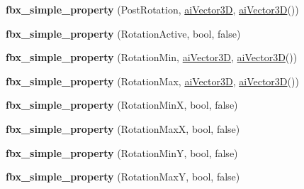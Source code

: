 \begin{DoxyCompactItemize}
\item 
\hypertarget{class_assimp_1_1_f_b_x_1_1_model_ac68b7ffeca0f773d5d138331313d65d6}{{\bfseries fbx\+\_\+simple\+\_\+property} (Post\+Rotation, \hyperlink{structai_vector3_d}{ai\+Vector3\+D}, \hyperlink{structai_vector3_d}{ai\+Vector3\+D}())}\label{class_assimp_1_1_f_b_x_1_1_model_ac68b7ffeca0f773d5d138331313d65d6}

\item 
\hypertarget{class_assimp_1_1_f_b_x_1_1_model_aa38a68cb0289031c447141225fe23e53}{{\bfseries fbx\+\_\+simple\+\_\+property} (Rotation\+Active, bool, false)}\label{class_assimp_1_1_f_b_x_1_1_model_aa38a68cb0289031c447141225fe23e53}

\item 
\hypertarget{class_assimp_1_1_f_b_x_1_1_model_ab06a2ef1d433bc8c077838930423e274}{{\bfseries fbx\+\_\+simple\+\_\+property} (Rotation\+Min, \hyperlink{structai_vector3_d}{ai\+Vector3\+D}, \hyperlink{structai_vector3_d}{ai\+Vector3\+D}())}\label{class_assimp_1_1_f_b_x_1_1_model_ab06a2ef1d433bc8c077838930423e274}

\item 
\hypertarget{class_assimp_1_1_f_b_x_1_1_model_ab4ee46e810103b4b8accaae40c39a97c}{{\bfseries fbx\+\_\+simple\+\_\+property} (Rotation\+Max, \hyperlink{structai_vector3_d}{ai\+Vector3\+D}, \hyperlink{structai_vector3_d}{ai\+Vector3\+D}())}\label{class_assimp_1_1_f_b_x_1_1_model_ab4ee46e810103b4b8accaae40c39a97c}

\item 
\hypertarget{class_assimp_1_1_f_b_x_1_1_model_a6cb91946477cb79200ad57b22aa2d0b3}{{\bfseries fbx\+\_\+simple\+\_\+property} (Rotation\+Min\+X, bool, false)}\label{class_assimp_1_1_f_b_x_1_1_model_a6cb91946477cb79200ad57b22aa2d0b3}

\item 
\hypertarget{class_assimp_1_1_f_b_x_1_1_model_a4d69bb29e7a3179225749bba6ff0bd20}{{\bfseries fbx\+\_\+simple\+\_\+property} (Rotation\+Max\+X, bool, false)}\label{class_assimp_1_1_f_b_x_1_1_model_a4d69bb29e7a3179225749bba6ff0bd20}

\item 
\hypertarget{class_assimp_1_1_f_b_x_1_1_model_abff42bc6212e18965e683f4c9baa86ea}{{\bfseries fbx\+\_\+simple\+\_\+property} (Rotation\+Min\+Y, bool, false)}\label{class_assimp_1_1_f_b_x_1_1_model_abff42bc6212e18965e683f4c9baa86ea}

\item 
\hypertarget{class_assimp_1_1_f_b_x_1_1_model_a78b3b1b67e0b56158dc14375323137b2}{{\bfseries fbx\+\_\+simple\+\_\+property} (Rotation\+Max\+Y, bool, false)}\label{class_assimp_1_1_f_b_x_1_1_model_a78b3b1b67e0b56158dc14375323137b2}


\end{DoxyCompactItemize}
